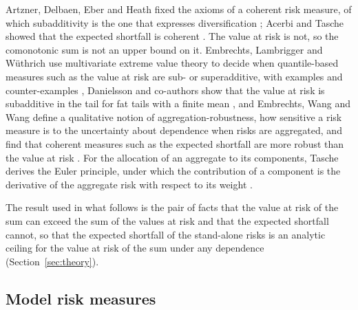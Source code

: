 Artzner, Delbaen, Eber and Heath fixed the axioms of a coherent risk measure, of which subadditivity is the one that expresses
diversification \citep{artzner1999}; Acerbi and Tasche showed that the expected shortfall is coherent \citep{acerbi2002}. The value
at risk is not, so the comonotonic sum is not an upper bound on it. Embrechts, Lambrigger and W\"uthrich use multivariate extreme value theory to decide when quantile-based measures such as the
value at risk are sub- or superadditive, with examples and counter-examples \citep{elw2008}, Danielsson and co-authors show that the value
at risk is subadditive in the tail for fat tails with a finite mean \citep{danielsson2013}, and Embrechts, Wang and Wang define a qualitative notion of
aggregation-robustness, how sensitive a risk measure is to the uncertainty about dependence when risks are aggregated, and find
that coherent measures such as the expected shortfall are more robust than the value at risk \citep{ewang2015}. For the allocation of an aggregate to its components,
Tasche derives the Euler principle, under which the contribution of a component is the derivative of the aggregate risk with
respect to its weight \citep{tasche2008}.

The result used in what follows is the pair of facts that the value at risk of the sum can exceed the sum of the values at risk and
that the expected shortfall cannot, so that the expected shortfall of the stand-alone risks is an analytic ceiling for the value at
risk of the sum under any dependence (Section~\ref{sec:theory}).

\subsection{Model risk measures}
\label{sec:rw-modelrisk}

